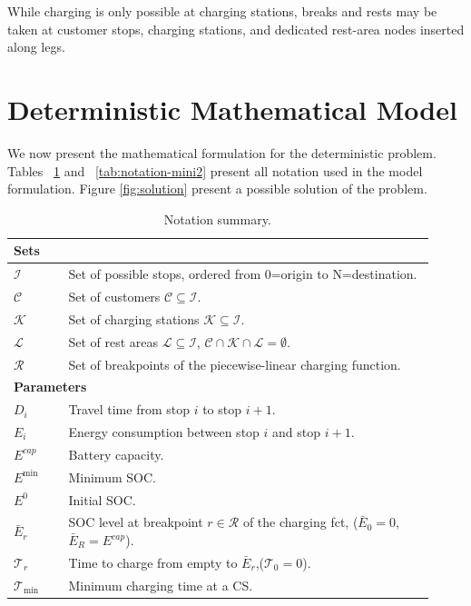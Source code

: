 \documentclass[preprint,12pt,3p]{elsarticle}
\begin{document}
While charging is only possible at charging stations,  breaks and rests may be taken at customer stops, charging stations, and dedicated rest-area nodes inserted along legs.


\section{Deterministic Mathematical Model} \label{sec:model}
We now present the mathematical formulation for the deterministic problem. Tables ~\ref{tab:notation-mini} and ~\ref{tab:notation-mini2} present all notation used in the model formulation. Figure \ref{fig:solution} present a possible solution of the problem.



\begin{table}[h!]
\centering
\caption{Notation summary.}
\label{tab:notation-mini}
\small
\begin{tabular}{p{0.12\linewidth}p{0.8\linewidth}}
\toprule
\multicolumn{2}{l}{\textbf{Sets}}\\
\midrule
$\mathcal{I}$ & Set of possible stops, ordered from 0=origin to N=destination.\\
$\mathcal{C}$ & Set of customers $\mathcal C \subseteq \mathcal I$.\\
$\mathcal{K}$ & Set of charging stations $\mathcal K \subseteq \mathcal I$.\\
$\mathcal{L}$ & Set of rest areas $\mathcal L \subseteq \mathcal I$, $\mathcal C \cap \mathcal K \cap \mathcal L= \emptyset$.\\
$\mathcal{R}$ & Set of breakpoints of the piecewise-linear charging function.\\
\midrule
\multicolumn{2}{l}{\textbf{Parameters}}\\
\midrule
$D_i$ & Travel time from stop $i$ to stop $i+1$.\\
$E_i$ & Energy consumption between stop $i$ and stop $i+1$.\\
$E^{cap}$ & Battery capacity. \\
$E^{\min}$ & Minimum SOC. \\
$E^0$ & Initial SOC. \\

$\bar{E}_r$  & SOC level at breakpoint $r \in \mathcal{R}$ of the charging fct, ($\bar{E}_0 = 0$, $\bar{E}_R = E^{cap}$).\\
$\mathcal{T}_r$ & Time to charge from empty to $\bar{E}_r$,($\mathcal{T}_0 = 0$).\\
$\mathcal{T}_{\text{min}}$ & Minimum charging time at a CS.\\



\end{tabular}
\end{table}
\end{document}
